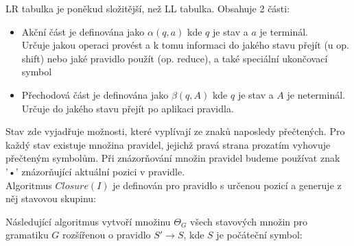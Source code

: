 LR tabulka je poněkud složitější, než LL tabulka. Obsahuje 2 části:

\begin{itemize}
  \item Akční část je definována jako $\alpha(q, a)$ kde $q$ je stav a $a$ je terminál.\\
  Určuje jakou operaci provést a k tomu informaci
  do jakého stavu přejít (u op. shift) nebo jaké pravidlo použít (op. reduce), a také speciální
  ukončovací symbol
  \item Přechodová část je definována jako $\beta(q, A)$ kde $q$ je stav a $A$ je neterminál.\\
  Určuje do jakého stavu přejít po aplikaci pravidla.
\end{itemize}

Stav zde vyjadřuje možnosti, které vyplívají ze znaků naposledy přečtených.
Pro každý stav existuje množina pravidel, jejichž pravá strana prozatím vyhovuje přečteným symbolům.
Při znázorňování množin pravidel budeme používat znak '•' znázorňující aktuální pozici v pravidle.\\

\noindent
Algoritmus $Closure(I)$ je definován pro pravidlo s určenou pozicí a generuje z něj stavovou skupinu:\\
\begin{algorithm}[H]
  \caption{$Closure(I)$}

  \BlankLine
\end{algorithm}
\vspace{0.5cm}

\noindent
Následující algoritmus vytvoří množinu $\Theta_G$ všech stavových množin pro gramatiku $G$ rozšířenou o
pravidlo $S' \rightarrow S$, kde $S$ je počáteční symbol:\\
\begin{algorithm}[H]
  \caption{$\Theta_G$}
  \label{alg:groups}

  \BlankLine
\end{algorithm}
\vspace{0.5cm}

